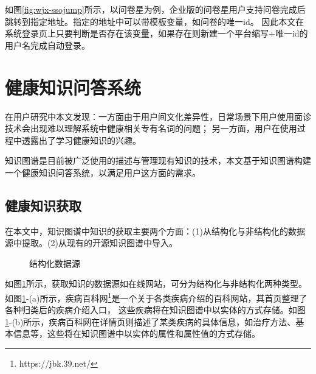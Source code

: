 如图\ref{fig:wjx-ssojump}所示，以问卷星为例，企业版的问卷星用户支持问卷完成后跳转到指定地址。指定的地址中可以带模板变量，如问卷的唯一id。
因此本文在系统登录页上只要判断是否存在该变量，如果存在则新建一个平台缩写+唯一id的用户名完成自动登录。


\section{健康知识问答系统}
\label{sec:qa_system}
在用户研究中本文发现：一方面由于用户间文化差异性，日常场景下用户使用面诊技术会出现难以理解系统中健康相关专有名词的问题；
另一方面，用户在使用过程中透露出了学习健康知识的兴趣。

知识图谱是目前被广泛使用的描述与管理现有知识的技术，本文基于知识图谱构建一个健康知识问答系统，以满足用户这方面的需求。

\subsection{健康知识获取}

在本文中，知识图谱中知识的获取主要两个方面：(1)从结构化与非结构化的数据源中提取。(2)从现有的开源知识图谱中导入。

\begin{figure}[h]
    \centering
    \caption[]{结构化数据源}
    \label{fig:source}
\end{figure}

如图\ref{fig:source}所示，获取知识的数据源如在线网站，可分为结构化与非结构化两种类型。
如图\ref{fig:source}-(a)所示，疾病百科网\footnote{https://jbk.39.net/}是一个关于各类疾病介绍的百科网站，其首页整理了各种归类后的疾病介绍入口，
这些疾病将在知识图谱中以实体的方式存储。如图\ref{fig:source}-(b)所示，疾病百科网在详情页则描述了某类疾病的具体信息，如治疗方法、基本信息等，这些将在知识图谱中以实体的属性和属性值的方式存储。

